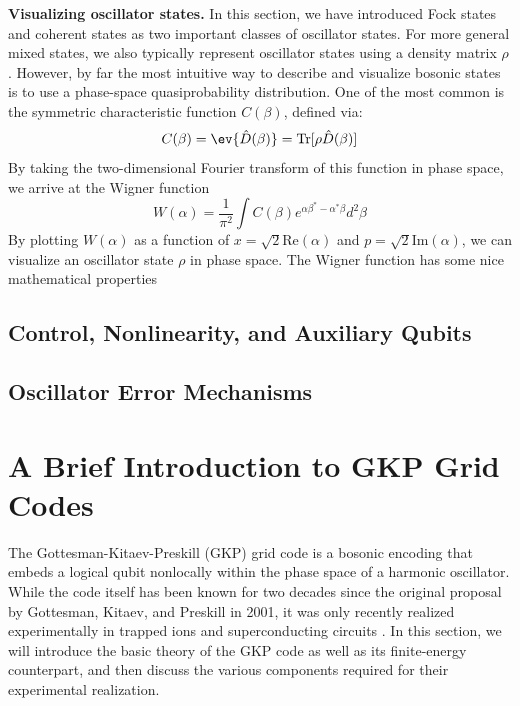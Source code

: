 \noindent \textbf{Visualizing oscillator states.} In this section, we have introduced Fock states and coherent states as two important classes of oscillator states. For more general mixed states, we also typically represent oscillator states using a density matrix $\rho$. However, by far the most intuitive way to describe and visualize bosonic states is to use a phase-space quasiprobability distribution. One of the most common is the symmetric characteristic function $C(\beta)$, defined via: 
\begin{equation}
    C(\beta) = \ev{\hat{D}(\beta)} = \Tr[\rho \hat{D}(\beta)] 
\end{equation}
By taking the two-dimensional Fourier transform of this function in phase space, we arrive at the Wigner function
\begin{equation}
    W(\alpha) = \frac{1}{\pi^2}\int C(\beta) e^{\alpha\beta^\ast - \alpha^\ast\beta} d^2\beta
\end{equation}
By plotting $W(\alpha)$ as a function of $x = \sqrt{2}\mathrm{Re}(\alpha)$ and $p = \sqrt{2}\mathrm{Im}(\alpha)$, we can visualize an oscillator state $\rho$ in phase space. The Wigner function has some nice mathematical properties 




\subsection{Control, Nonlinearity, and Auxiliary Qubits}

\subsection{Oscillator Error Mechanisms}



\section{A Brief Introduction to GKP Grid Codes}

The Gottesman-Kitaev-Preskill (GKP) grid code is a bosonic encoding that embeds a logical qubit nonlocally within the phase space of a harmonic oscillator. While the code itself has been known for two decades since the original proposal by Gottesman, Kitaev, and Preskill \cite{gottesman2001gkp} in 2001, it was only recently realized experimentally in trapped ions \cite{fluhmann2019gkp-expt, deneeve2022gkp-expt} and superconducting circuits \cite{campagne2020gkp-expt, sivak2023gkp-expt, nordquantique2023gkp-expt}. In this section, we will introduce the basic theory of the GKP code as well as its finite-energy counterpart, and then discuss the various components required for their experimental realization. 

